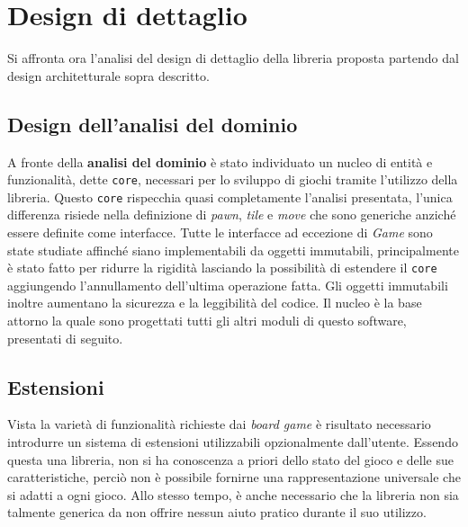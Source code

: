 \section{Design di dettaglio}\label{sec:detailed_design}



Si affronta ora l'analisi del design di dettaglio della libreria proposta partendo dal design architetturale sopra descritto.


\subsection{Design dell'analisi del dominio}
A fronte della \textbf{analisi del dominio} è stato individuato un nucleo di entità e funzionalità, dette \texttt{core}, necessari per lo sviluppo di giochi tramite l'utilizzo della libreria.
%
Questo \texttt{core} rispecchia quasi completamente l'analisi presentata, l'unica differenza risiede nella definizione di \textit{pawn}, \textit{tile} e \textit{move} che sono generiche anziché essere definite come interfacce.
%
Tutte le interfacce ad eccezione di \textit{Game} sono state studiate affinché siano implementabili da oggetti immutabili, principalmente è stato fatto per ridurre la rigidità lasciando la possibilità di estendere il \texttt{core} aggiungendo l'annullamento dell'ultima operazione fatta.
%
Gli oggetti immutabili inoltre aumentano la sicurezza e la leggibilità del codice.
%
Il nucleo è la base attorno la quale sono progettati tutti gli altri moduli di questo software, presentati di seguito.


\subsection{Estensioni}

Vista la varietà di funzionalità richieste dai \textit{board game} è risultato necessario introdurre un sistema di estensioni utilizzabili opzionalmente dall'utente.
%
Essendo questa una libreria, non si ha conoscenza a priori dello stato del gioco e delle sue caratteristiche, perciò non è possibile fornirne una rappresentazione universale che si adatti a ogni gioco.
%
Allo stesso tempo, è anche necessario che la libreria non sia talmente generica da non offrire nessun aiuto pratico durante il suo utilizzo.

